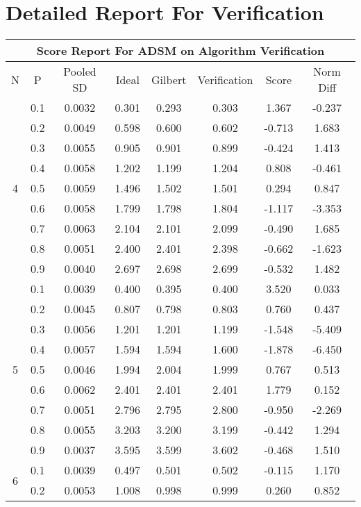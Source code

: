 \documentclass[11pt,a4paper]{report}
\begin{document}
\chapter{Detailed Report For Verification}
\begin{longtable}{ | c | c || c | c | c | c | c | c | }
\hline
\multicolumn{8}{|c|}{ Score Report For ADSM on Algorithm Verification} \\
\hline
N & P & Pooled SD &  Ideal &  Gilbert & Verification  & Score & Norm Diff \\
 \hline
 \hline
 \endhead
\multirow{9}{*}{4} & 0.1 & 0.0032 & 0.301 & 0.293 & 0.303 & 1.367 & -0.237 \\
 & 0.2 & 0.0049 & 0.598 & 0.600 & 0.602 & -0.713 & 1.683 \\
 & 0.3 & 0.0055 & 0.905 & 0.901 & 0.899 & -0.424 & 1.413 \\
 & 0.4 & 0.0058 & 1.202 & 1.199 & 1.204 & 0.808 & -0.461 \\
 & 0.5 & 0.0059 & 1.496 & 1.502 & 1.501 & 0.294 & 0.847 \\
 & 0.6 & 0.0058 & 1.799 & 1.798 & 1.804 & -1.117 & -3.353 \\
 & 0.7 & 0.0063 & 2.104 & 2.101 & 2.099 & -0.490 & 1.685 \\
 & 0.8 & 0.0051 & 2.400 & 2.401 & 2.398 & -0.662 & -1.623 \\
 & 0.9 & 0.0040 & 2.697 & 2.698 & 2.699 & -0.532 & 1.482 \\
 \hline
\multirow{9}{*}{5} & 0.1 & 0.0039 & 0.400 & 0.395 & 0.400 & 3.520 & 0.033 \\
 & 0.2 & 0.0045 & 0.807 & 0.798 & 0.803 & 0.760 & 0.437 \\
 & 0.3 & 0.0056 & 1.201 & 1.201 & 1.199 & -1.548 & -5.409 \\
 & 0.4 & 0.0057 & 1.594 & 1.594 & 1.600 & -1.878 & -6.450 \\
 & 0.5 & 0.0046 & 1.994 & 2.004 & 1.999 & 0.767 & 0.513 \\
 & 0.6 & 0.0062 & 2.401 & 2.401 & 2.401 & 1.779 & 0.152 \\
 & 0.7 & 0.0051 & 2.796 & 2.795 & 2.800 & -0.950 & -2.269 \\
 & 0.8 & 0.0055 & 3.203 & 3.200 & 3.199 & -0.442 & 1.294 \\
 & 0.9 & 0.0037 & 3.595 & 3.599 & 3.602 & -0.468 & 1.510 \\
 \hline
\multirow{9}{*}{6} & 0.1 & 0.0039 & 0.497 & 0.501 & 0.502 & -0.115 & 1.170 \\
 & 0.2 & 0.0053 & 1.008 & 0.998 & 0.999 & 0.260 & 0.852 \\

\end{longtable}
\end{document}
